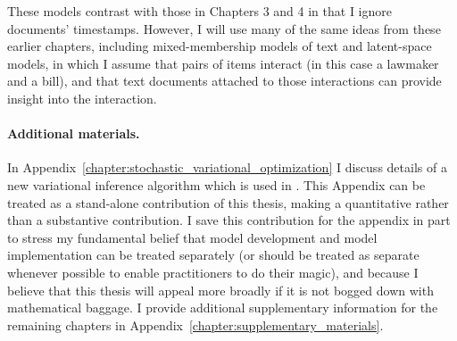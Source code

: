 These models contrast with those in Chapters 3 and 4 in that I ignore
documents' timestamps.  However, I will use many of the same ideas
from these earlier chapters, including mixed-membership models of text
and latent-space models, in which I assume that pairs of items
interact (in this case a lawmaker and a bill), and that text documents
attached to those interactions can provide insight into the
interaction.

\paragraph{Additional materials.}
In Appendix~\ref{chapter:stochastic_variational_optimization} I
discuss details of a new variational inference algorithm which is used
in .  This Appendix can be treated as a
stand-alone contribution of this thesis, making a quantitative rather
than a substantive contribution.  I save this contribution for the
appendix in part to stress my fundamental belief that model
development and model implementation can be treated separately (or
should be treated as separate whenever possible to enable
practitioners to do their magic), and because I believe that this
thesis will appeal more broadly if it is not bogged down with
mathematical baggage.  I provide additional supplementary information
for the remaining chapters in
Appendix~\ref{chapter:supplementary_materials}.

